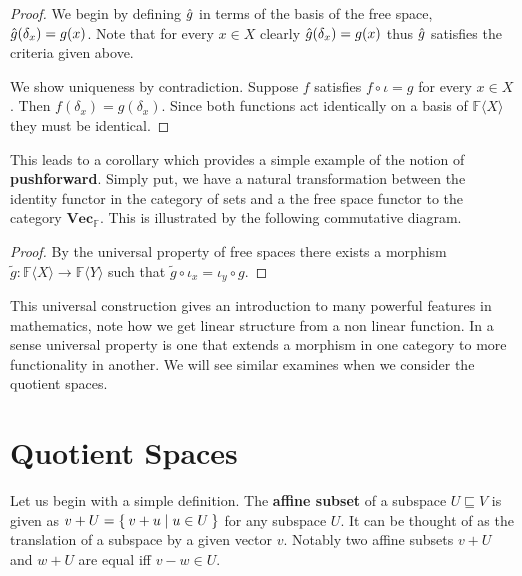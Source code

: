 \documentclass[12pt]{extarticle}
\newcommand{\freespace}[1] {{\F\langle #1 \rangle}}
\renewcommand{\to}[0]{\longrightarrow}
\newcommand{\cat}[1]{{\textbf{#1}}}
\newcommand{\F}{{\mathbb{F}}}
\begin{document}
\begin{proof}
  We begin by defining $\Hat{g}$ in terms of the basis of the free space, $\Hat{g}(\delta_x) = g(x)$. Note that for every $x \in X$ clearly $\Hat{g}(\delta_x) = g(x)$ thus $\Hat{g}$ satisfies the criteria given above. 
  
  We show uniqueness by contradiction. Suppose $f$ satisfies $f \circ \iota = g$ for every $x \in X$. Then $f(\delta_x) = g(\delta_x)$. Since both functions act identically on a basis of $\freespace{X}$ they must be identical.
\end{proof}

This leads to a corollary which provides a simple example of the notion of \textbf{pushforward}. Simply put, we have a natural transformation between the identity functor in the category of sets and a the free space functor to the category $\cat{Vec}_\F$. This is illustrated by the following commutative diagram. 

\begin{center}
\end{center}

\begin{proof}
  By the universal property of free spaces there exists a morphism $\tilde{g}: \freespace{X} \to \freespace{Y}$ such that $\tilde{g} \circ \iota_x = \iota_y \circ g$. 
\end{proof}

This universal construction gives an introduction to many powerful features in mathematics, note how we get linear structure from a non linear function. In a sense universal property is one that extends a morphism in one category to more functionality in another. We will see similar examines when we consider the quotient spaces. 

\section*{Quotient Spaces} 

Let us begin with a simple definition. The \textbf{affine subset} of a subspace $U \sqsubseteq V$ is given as $v + U = \Set{ v + u \mid u \in U}$ for any subspace $U$. It can be thought of as the translation of a subspace by a given vector $v$. Notably two affine subsets $v + U$ and $w + U$ are equal iff $v - w \in U$.
\end{document}
